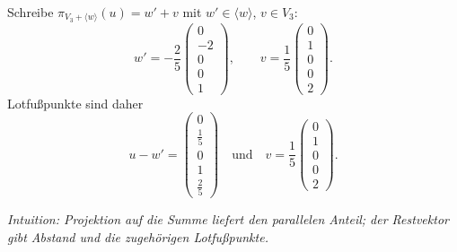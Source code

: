 \documentclass[11pt, a4paper]{article}
\begin{document}
\begin{enumerate}
\begin{framed}
  Schreibe $\pi_{V_3+\langle w\rangle}(u)=w'+v$ mit $w'\in\langle w\rangle$, $v\in V_3$:
  \[
  w'=-\frac{2}{5}\begin{pmatrix}0\\-2\\0\\0\\1\end{pmatrix},\qquad
  v=\frac{1}{5}\begin{pmatrix}0\\1\\0\\0\\2\end{pmatrix}.
  \]
  Lotfußpunkte sind daher
  \[
  u-w'=\begin{pmatrix}0\\\tfrac{1}{5}\\0\\1\\\tfrac{2}{5}\end{pmatrix}
  \quad\text{und}\quad
  v=\frac{1}{5}\begin{pmatrix}0\\1\\0\\0\\2\end{pmatrix}.
  \]

  \medskip\noindent\textit{Intuition: Projektion auf die Summe liefert den parallelen Anteil; der Restvektor gibt Abstand und die zugehörigen Lotfußpunkte.}
  \end{framed}
\end{enumerate}
\end{document}
